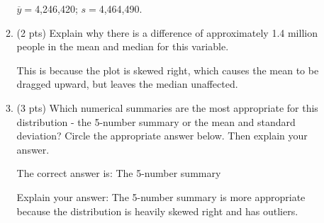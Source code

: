 \documentclass{article}[11pt]
\begin{document}
\begin{enumerate}
\begin{enumerate}
$\overline{y} = $4,246,420; $s = $4,464,490.

\item (2 pts) Explain why there is a difference of approximately 1.4 million people in the mean and median for this variable.

This is because the plot is skewed right, which causes the mean to be dragged upward, but leaves the median unaffected.

\item (3 pts) Which numerical summaries are the most appropriate for this distribution - the 5-number summary or the mean and standard deviation?  Circle the appropriate answer below.  Then explain your answer.

The correct answer is: The 5-number summary

Explain your answer: The 5-number summary is more appropriate because the distribution is heavily skewed right and has outliers.

\end{enumerate}

\end{enumerate}
\end{document}
